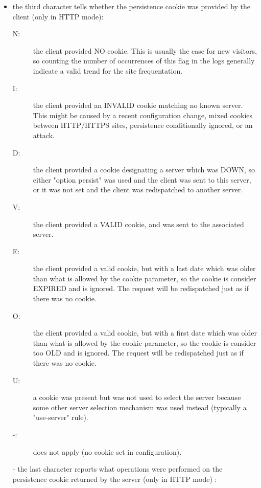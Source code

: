 \begin{itemize}
\item
    the third character tells whether the persistence cookie was provided by
    the client (only in HTTP mode):

        \begin{description}
        \item[N:]
            the client provided NO cookie. This is usually the case for new
            visitors, so counting the number of occurrences of this flag in the
            logs generally indicate a valid trend for the site frequentation.
        \item[I:]
            the client provided an INVALID cookie matching no known server.
            This might be caused by a recent configuration change, mixed
            cookies between HTTP/HTTPS sites, persistence conditionally
            ignored, or an attack.
        \item[D:]
            the client provided a cookie designating a server which was DOWN,
            so either "option persist" was used and the client was sent to
            this server, or it was not set and the client was redispatched to
            another server.
        \item[V:]
            the client provided a VALID cookie, and was sent to the associated
            server.
        \item[E:]
            the client provided a valid cookie, but with a last date which was
            older than what is allowed by the  cookie parameter, so
            the cookie is consider EXPIRED and is ignored. The request will be
            redispatched just as if there was no cookie.
        \item[O:]
            the client provided a valid cookie, but with a first date which was
            older than what is allowed by the  cookie parameter, so
            the cookie is consider too OLD and is ignored. The request will be
            redispatched just as if there was no cookie.
        \item[U:]
            a cookie was present but was not used to select the server because
            some other server selection mechanism was used instead (typically a
            "use-server" rule).
        \item[-:]
            does not apply (no cookie set in configuration).
        \end{description}

\item[-]
    the last character reports what operations were performed on the persistence
    cookie returned by the server (only in HTTP mode) :


\end{itemize}
